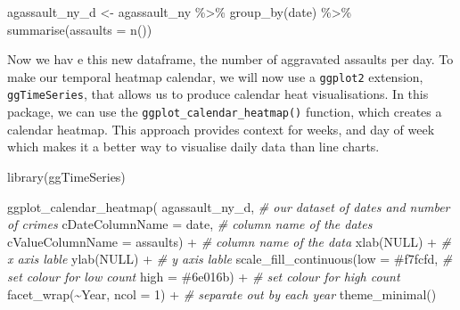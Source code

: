 \documentclass[
  krantz2]{krantz}
\makeatletter
\newenvironment{Shaded}{\begin{snugshade}}{\end{snugshade}}
\newcommand{\AttributeTok}[1]{\textcolor[rgb]{0.61,0.61,0.61}{#1}}
\newcommand{\CommentTok}[1]{\textcolor[rgb]{0.37,0.37,0.37}{\textit{#1}}}
\newcommand{\ConstantTok}[1]{\textcolor[rgb]{0,0,0}{#1}}
\newcommand{\DecValTok}[1]{\textcolor[rgb]{0.06,0.06,0.06}{#1}}
\newcommand{\FunctionTok}[1]{\textcolor[rgb]{0,0,0}{#1}}
\newcommand{\NormalTok}[1]{#1}
\newcommand{\OtherTok}[1]{\textcolor[rgb]{0.37,0.37,0.37}{#1}}
\newcommand{\SpecialCharTok}[1]{\textcolor[rgb]{0,0,0}{#1}}
\newcommand{\StringTok}[1]{\textcolor[rgb]{0.5,0.5,0.5}{#1}}
\newenvironment{kframe}{%
\medskip{}
\setlength{\fboxsep}{.8em}
 \def\at@end@of@kframe{}%
 \ifinner\ifhmode%
  \def\at@end@of@kframe{\end{minipage}}%
  \begin{minipage}{\columnwidth}%
 \fi\fi%
 \def\FrameCommand##1{\hskip\@totalleftmargin \hskip-\fboxsep
 \colorbox{shadecolor}{##1}\hskip-\fboxsep
     \hskip-\linewidth \hskip-\@totalleftmargin \hskip\columnwidth}%
 \MakeFramed {\advance\hsize-\width
   \@totalleftmargin\z@ \linewidth\hsize
   \@setminipage}}%
 {\par\unskip\endMakeFramed%
 \at@end@of@kframe}
\renewenvironment{Shaded}{\begin{kframe}}{\end{kframe}}
\makeatother
\begin{document}
\begin{Shaded}
\begin{Highlighting}[]
\NormalTok{agassault\_ny\_d }\OtherTok{\textless{}{-}}\NormalTok{ agassault\_ny }\SpecialCharTok{\%\textgreater{}\%}
                    \FunctionTok{group\_by}\NormalTok{(date) }\SpecialCharTok{\%\textgreater{}\%}
                    \FunctionTok{summarise}\NormalTok{(}\AttributeTok{assaults =} \FunctionTok{n}\NormalTok{())}
\end{Highlighting}
\end{Shaded}

Now we hav
e this new dataframe, the number of aggravated assaults per day. To make our temporal heatmap calendar, we will now use a \texttt{ggplot2} extension, \texttt{ggTimeSeries}, that allows us to produce calendar heat visualisations. In this package, we can use the \texttt{ggplot\_calendar\_heatmap()} function, which creates a calendar heatmap. This approach provides context for weeks, and day of week which makes it a better way to visualise daily data than line charts.

\begin{Shaded}
\begin{Highlighting}[]
\FunctionTok{library}\NormalTok{(ggTimeSeries)}

\FunctionTok{ggplot\_calendar\_heatmap}\NormalTok{(}
\NormalTok{   agassault\_ny\_d,  }\CommentTok{\# our dataset of dates and number of crimes}
   \AttributeTok{cDateColumnName =} \StringTok{\textquotesingle{}date\textquotesingle{}}\NormalTok{, }\CommentTok{\# column name of the dates}
   \AttributeTok{cValueColumnName =} \StringTok{\textquotesingle{}assaults\textquotesingle{}}\NormalTok{) }\SpecialCharTok{+} \CommentTok{\# column name of the data}
   \FunctionTok{xlab}\NormalTok{(}\ConstantTok{NULL}\NormalTok{) }\SpecialCharTok{+} \CommentTok{\# x axis lable}
   \FunctionTok{ylab}\NormalTok{(}\ConstantTok{NULL}\NormalTok{) }\SpecialCharTok{+} \CommentTok{\# y axis lable}
   \FunctionTok{scale\_fill\_continuous}\NormalTok{(}\AttributeTok{low =} \StringTok{\textquotesingle{}\#f7fcfd\textquotesingle{}}\NormalTok{,  }\CommentTok{\# set colour for low count}
                         \AttributeTok{high =} \StringTok{\textquotesingle{}\#6e016b\textquotesingle{}}\NormalTok{) }\SpecialCharTok{+}   \CommentTok{\# set colour for high count}
  \FunctionTok{facet\_wrap}\NormalTok{(}\SpecialCharTok{\textasciitilde{}}\NormalTok{Year, }\AttributeTok{ncol =} \DecValTok{1}\NormalTok{) }\SpecialCharTok{+}  \CommentTok{\# separate out by each year}
  \FunctionTok{theme\_minimal}\NormalTok{()}
\end{Highlighting}
\end{Shaded}
\end{document}
